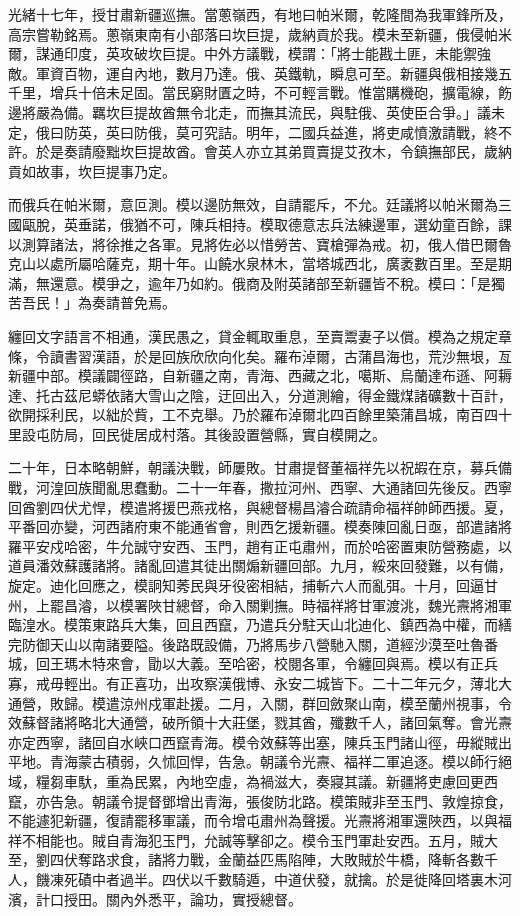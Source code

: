\begin{pinyinscope}
光緒十七年，授甘肅新疆巡撫。當蔥嶺西，有地曰帕米爾，乾隆間為我軍鋒所及，高宗嘗勒銘焉。蔥嶺東南有小部落曰坎巨提，歲納貢於我。模未至新疆，俄侵帕米爾，謀通印度，英攻破坎巨提。中外方議戰，模謂：「將士能戡土匪，未能禦強敵。軍資百物，運自內地，數月乃達。俄、英鐵軌，瞬息可至。新疆與俄相接幾五千里，增兵十倍未足固。當民窮財匱之時，不可輕言戰。惟當購機砲，擴電線，飭邊將嚴為備。羈坎巨提故酋無令北走，而撫其流民，與駐俄、英使臣合爭。」議未定，俄曰防英，英曰防俄，莫可究詰。明年，二國兵益進，將吏咸憤激請戰，終不許。於是奏請廢黜坎巨提故酋。會英人亦立其弟買賣提艾孜木，令鎮撫部民，歲納貢如故事，坎巨提事乃定。

而俄兵在帕米爾，意叵測。模以邊防無效，自請罷斥，不允。廷議將以帕米爾為三國甌脫，英垂諾，俄猶不可，陳兵相持。模取德意志兵法練邊軍，選幼童百餘，課以測算諸法，將徐推之各軍。見將佐必以惜勞苦、寶槍彈為戒。初，俄人借巴爾魯克山以處所屬哈薩克，期十年。山饒水泉林木，當塔城西北，廣袤數百里。至是期滿，無還意。模爭之，逾年乃如約。俄商及附英諸部至新疆皆不稅。模曰：「是獨苦吾民！」為奏請普免焉。

纏回文字語言不相通，漢民愚之，貸金輒取重息，至賣鬻妻子以償。模為之規定章條，令讀書習漢語，於是回族欣欣向化矣。羅布淖爾，古蒲昌海也，荒沙無垠，亙新疆中部。模議闢徑路，自新疆之南，青海、西藏之北，噶斯、烏蘭達布遜、阿耨達、托古茲尼蟒依諸大雪山之陰，迂回出入，分道測繪，得金鐵煤諸礦數十百計，欲開採利民，以絀於貲，工不克舉。乃於羅布淖爾北四百餘里築蒲昌城，南百四十里設屯防局，回民徙居成村落。其後設置營縣，實自模開之。

二十年，日本略朝鮮，朝議決戰，師屢敗。甘肅提督董福祥先以祝嘏在京，募兵備戰，河湟回族聞亂思蠢動。二十一年春，撒拉河州、西寧、大通諸回先後反。西寧回酋劉四伏尤悍，模遣將援巴燕戎格，與總督楊昌濬合疏請命福祥帥師西援。夏，平番回亦變，河西諸府東不能通省會，則西乞援新疆。模奏陳回亂日亟，部遣諸將羅平安戍哈密，牛允誠守安西、玉門，趙有正屯肅州，而於哈密置東防營務處，以道員潘效蘇護諸將。諸亂回遣其徒出關煽新疆回部。九月，綏來回發難，以有備，旋定。迪化回應之，模詗知莠民與牙役密相結，捕斬六人而亂弭。十月，回逼甘州，上罷昌濬，以模署陜甘總督，命入關剿撫。時福祥將甘軍渡洮，魏光燾將湘軍臨湟水。模策東路兵大集，回且西竄，乃遣兵分駐天山北迪化、鎮西為中權，而繕完防御天山以南諸要隘。後路既設備，乃將馬步八營馳入關，道經沙漠至吐魯番城，回王瑪木特來會，勖以大義。至哈密，校閱各軍，令纏回與焉。模以有正兵寡，戒毋輕出。有正喜功，出攻察漢俄博、永安二城皆下。二十二年元夕，薄北大通營，敗歸。模遣涼州戍軍赴援。二月，入關，群回斂聚山南，模至蘭州視事，令效蘇督諸將略北大通營，破所領十大莊堡，戮其酋，殲數千人，諸回氣奪。會光燾亦定西寧，諸回自水峽口西竄青海。模令效蘇等出塞，陳兵玉門諸山徑，毋縱賊出平地。青海蒙古積弱，久怵回悍，告急。朝議令光燾、福祥二軍追逐。模以師行絕域，糧芻車馱，重為民累，內地空虛，為禍滋大，奏寢其議。新疆將吏慮回更西竄，亦告急。朝議令提督鄧增出青海，張俊防北路。模策賊非至玉門、敦煌掠食，不能遽犯新疆，復請罷移軍議，而令增屯肅州為聲援。光燾將湘軍還陜西，以與福祥不相能也。賊自青海犯玉門，允誠等擊卻之。模令玉門軍赴安西。五月，賊大至，劉四伏奪路求食，諸將力戰，金蘭益匹馬陷陣，大敗賊於牛橋，降斬各數千人，饑凍死磧中者過半。四伏以千數騎遁，中道伏發，就擒。於是徙降回塔裏木河濱，計口授田。關內外悉平，論功，實授總督。


\end{pinyinscope}

